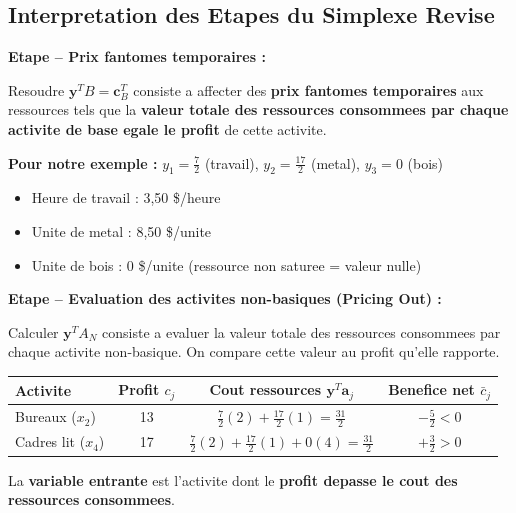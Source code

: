 \documentclass[12pt,a4paper]{article}
\newcommand*\circled[1]{\tikz[baseline=(char.base)]{\node[shape=circle,draw,inner sep=2pt] (char) {#1};}}
\begin{document}
\subsection{Interpretation des Etapes du Simplexe Revise}

\begin{methode}
\textbf{Etape \circled{1} -- Prix fantomes temporaires :}

Resoudre $\mathbf{y}^T B = \mathbf{c}_B^T$ consiste a affecter des \textcolor{algoviolet}{\textbf{prix fantomes temporaires}} aux ressources tels que la \textbf{valeur totale des ressources consommees par chaque activite de base egale le profit} de cette activite.

\textbf{Pour notre exemple :} $y_1 = \frac{7}{2}$ (travail), $y_2 = \frac{17}{2}$ (metal), $y_3 = 0$ (bois)

\begin{itemize}
    \item Heure de travail : 3,50 \$/heure
    \item Unite de metal : 8,50 \$/unite
    \item Unite de bois : 0 \$/unite (ressource non saturee = valeur nulle)
\end{itemize}
\end{methode}

\begin{methode}
\textbf{Etape \circled{2} -- Evaluation des activites non-basiques (Pricing Out) :}

Calculer $\mathbf{y}^T A_N$ consiste a evaluer la valeur totale des ressources consommees par chaque activite non-basique. On compare cette valeur au profit qu'elle rapporte.

\begin{center}
\begin{tabular}{l|c|c|c}
\toprule
\textbf{Activite} & \textbf{Profit $c_j$} & \textbf{Cout ressources $\mathbf{y}^T \mathbf{a}_j$} & \textbf{Benefice net $\bar{c}_j$} \\
\midrule
Bureaux ($x_2$) & 13 & $\frac{7}{2}(2) + \frac{17}{2}(1) = \frac{31}{2}$ & $-\frac{5}{2} < 0$ \\
Cadres lit ($x_4$) & 17 & $\frac{7}{2}(2) + \frac{17}{2}(1) + 0(4) = \frac{31}{2}$ & $+\frac{3}{2} > 0$ \\
\bottomrule
\end{tabular}
\end{center}

La \textcolor{defvert}{\textbf{variable entrante}} est l'activite dont le \textbf{profit depasse le cout des ressources consommees}.
\end{methode}
\end{document}
